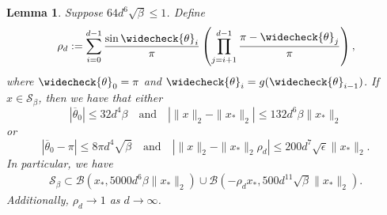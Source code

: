 \documentclass[11pt]{article}
\newtheorem{lemma}[theorem]{Lemma}
\newcommand{\thetabar}{\overline{\theta}}
\newcommand{\thetacheck}{\widecheck{\theta}}
\newcommand{\zetacheck}{\rho}
\newcommand{\xo}{x_\ast}
\newcommand\setS{\mathcal S}
\begin{document}
\begin{lemma} \label{lemma:Seps}
Suppose $64 d^6 \sqrt{\beta} \leq 1$.
Define
\[
\zetacheck_d := \sum_{i=0}^{d-1} \frac{\sin \thetacheck_{i}}{\pi} \left( \prod_{j=i+1}^{d-1} \frac{\pi - \thetacheck_{j} }{\pi} \right),
\]
where $\thetacheck_0= \pi$ and $\thetacheck_i = g(\thetacheck_{i-1})$.  If $x \in \setS_\beta$, then we have that either
\[
|\thetabar_0| \leq 32 d^4 \beta \quad \text{and} \quad |\|x\|_2 - \|\xo\|_2| \leq  132 d^6 \beta \|\xo\|_2
\]
or
\[
|\thetabar_0 - \pi|
\leq
8\pi d^4 \sqrt{\beta}  \quad \text{and} \quad  \left| \|x\|_2 - \|\xo\|_2 \zetacheck_d \right | \leq 200 d^7 \sqrt{\epsilon} \|\xo\|_2.
\]
In particular, we have
\begin{align}
\setS_\beta \subset \mathcal{B}(\xo, 5000 d^6 \beta \|\xo\|_2  ) \cup  \mathcal{B}( -\zetacheck_d \xo, 500 d^{11} \sqrt{\beta} \|\xo\|_2).
 \label{Seps-estimate-balls2}
\end{align}
Additionally, $\rho_d \to 1$ as $d \to \infty$.
\end{lemma}
\end{document}
